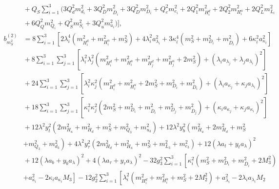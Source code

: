 \documentclass[preprint,amsmath,amssymb,aps,superscriptaddress,prd,
showpacs,floatfix,nofootinbib]{revtex4-1}
\begin{document}
\begin{subequations}
\begin{align}
\nonumber \\
& {} + Q_S \sum_{i=1}^3 \big ( 3 Q_d^2 m_{d_i}^2 +
3 Q_{\overline{D}}^2 m_{\overline{D}_i}^2 + 3 Q_D^2 m_{D_i}^2 +
Q_e^2 m_{e_i}^2 + 2 Q_1^2 m_{H_i^d}^2 + 2 Q_2^2 m_{H_i^u}^2 +
2 Q_L^2 m_{L_i}^2 \nonumber \\
& {} + 6 Q_Q^2 m_{Q_i}^2 + Q_S^2 m_{S_i}^2 + 3 Q_u^2 m_{u_i}^2 \big ) \bigg ]
, \label{eq:USSMms2BetaTwoLoop} \\
b_{m_S^2}^{(2)} &= 8 \sum_{i=1}^3 \left [ 2 \lambda_i^4 \left ( m_{H_i^d}^2 +
m_{H_i^u}^2 + m_S^2 \right ) + 4 \lambda_i^2 a_{\lambda_i}^2 + 3 \kappa_i^4
\left ( m_S^2 + m_{D_i}^2 + m_{\overline{D}_i}^2 \right ) +
6 \kappa_i^2 a_{\kappa_i}^2 \right ] \nonumber \\
& {} + 8 \sum_{i=1}^3 \sum_{j=1}^3 \left [ \lambda_i^2 \lambda_j^2
\left ( m_{H_i^d}^2 + m_{H_i^u}^2 + m_{H_j^d}^2 + m_{H_j^u}^2 + 2 m_S^2
\right ) + \left ( \lambda_i a_{\lambda_j} + \lambda_j a_{\lambda_i}
\right )^2 \right ] \nonumber \\
& {} + 24 \sum_{i=1}^3 \sum_{j=1}^3 \left [ \lambda_i^2 \kappa_j^2
\left ( m_{H_i^d}^2 + m_{H_i^u}^2 + 2 m_S^2 + m_{D_i}^2 + m_{\overline{D}_i}^2
\right ) + \left ( \lambda_i a_{\kappa_j} + \kappa_j a_{\lambda_i} \right )^2
\right ] \nonumber \\
& {} + 18 \sum_{i=1}^3 \sum_{j=1}^3 \left [ \kappa_i^2 \kappa_j^2
\left ( 2 m_S^2 + m_{D_i}^2 + m_{\overline{D}_i}^2 + m_{D_j}^2 +
m_{\overline{D}_j}^2 \right ) + \left ( \kappa_i a_{\kappa_j} +
\kappa_j a_{\kappa_i} \right )^2 \right ] \nonumber \\
& {} + 12 \lambda^2 y_t^2 \left ( 2 m_{H_u}^2 + m_{H_d}^2 + m_S^2 + m_{Q_3}^2
+ m_{u_3}^2 \right ) + 12 \lambda^2 y_b^2 \left ( m_{H_u}^2 + 2 m_{H_d}^2 +
m_S^2 \right . \nonumber \\
& {} \left . + m_{Q_3}^2 + m_{d_3}^2 \right ) + 4 \lambda^2 y_\tau^2
\left ( 2 m_{H_d}^2 + m_{H_u}^2 + m_S^2 + m_{L_3}^2 + m_{e_3}^2 \right ) +
12 \left ( \lambda a_t + y_t a_{\lambda} \right )^2 \nonumber \\
& {} + 12 \left ( \lambda a_b + y_b a_{\lambda} \right )^2 +
4 \left ( \lambda a_\tau + y_\tau a_{\lambda} \right )^2 -
32 g_3^2 \sum_{i=1}^3 \left [ \kappa_i^2 \left ( m_S^2 + m_{D_i}^2 +
m_{\overline{D}_i}^2 + 2 M_3^2 \right ) \right . \nonumber \\
& {} \left . + a_{\kappa_i}^2 - 2 \kappa_i a_{\kappa_i} M_3 \right ] -
12 g_2^2 \sum_{i=1}^3 \left [ \lambda_i^2 \left ( m_{H_i^d}^2 + m_{H_i^u}^2 +
m_S^2 + 2 M_2^2 \right ) + a_{\lambda_i}^2 - 2 \lambda_i a_{\lambda_i} M_2

\end{align}
\end{subequations}
\end{document}

